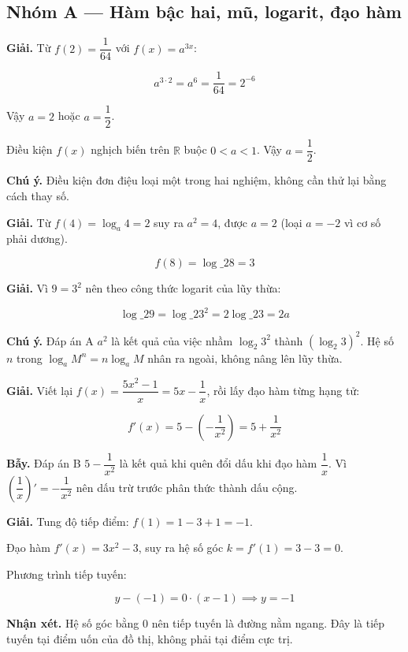 \documentclass[11pt, a4paper]{article}
\begin{document}

\subsection*{Nhóm A — Hàm bậc hai, mũ, logarit, đạo hàm}

\begin{dapan}[1 — Đáp án A]
\textbf{Giải.} Từ $f(2) = \dfrac{1}{64}$ với $f(x) = a^{3x}$:

$$a^{3 \cdot 2} = a^6 = \frac{1}{64} = 2^{-6}$$

Vậy $a = 2$ hoặc $a = \dfrac{1}{2}$.

Điều kiện $f(x)$ nghịch biến trên $\mathbb{R}$ buộc $0 < a < 1$. Vậy $a = \dfrac{1}{2}$.

\textbf{Chú ý.} Điều kiện đơn điệu loại một trong hai nghiệm, không cần thử lại bằng cách thay số.
\end{dapan}

\begin{dapan}[2 — Đáp án C]
\textbf{Giải.} Từ $f(4) = \log_a 4 = 2$ suy ra $a^2 = 4$, được $a = 2$ (loại $a = -2$ vì cơ số phải dương).

$$f(8) = \log\_2 8 = 3$$
\end{dapan}

\begin{dapan}[3 — Đáp án B]
\textbf{Giải.} Vì $9 = 3^2$ nên theo công thức logarit của lũy thừa:

$$\log\_2 9 = \log\_2 3^2 = 2\log\_2 3 = 2a$$

\textbf{Chú ý.} Đáp án A $a^2$ là kết quả của việc nhầm $\log_2 3^2$ thành $(\log_2 3)^2$. Hệ số $n$ trong $\log_a M^n = n\log_a M$ nhân ra ngoài, không nâng lên lũy thừa.
\end{dapan}

\begin{dapan}[4 — Đáp án D]
\textbf{Giải.} Viết lại $f(x) = \dfrac{5x^2 - 1}{x} = 5x - \dfrac{1}{x}$, rồi lấy đạo hàm từng hạng tử:

$$f'(x) = 5 - \left(-\frac{1}{x^2}\right) = 5 + \frac{1}{x^2}$$

\textbf{Bẫy.} Đáp án B $5 - \dfrac{1}{x^2}$ là kết quả khi quên đổi dấu khi đạo hàm $\dfrac{1}{x}$. Vì $\left(\dfrac{1}{x}\right)' = -\dfrac{1}{x^2}$ nên dấu trừ trước phân thức thành dấu cộng.
\end{dapan}

\begin{dapan}[5 — Đáp án A]
\textbf{Giải.} Tung độ tiếp điểm: $f(1) = 1 - 3 + 1 = -1$.

Đạo hàm $f'(x) = 3x^2 - 3$, suy ra hệ số góc $k = f'(1) = 3 - 3 = 0$.

Phương trình tiếp tuyến:

$$y - (-1) = 0 \cdot (x - 1) \implies y = -1$$

\textbf{Nhận xét.} Hệ số góc bằng $0$ nên tiếp tuyến là đường nằm ngang. Đây là tiếp tuyến tại điểm uốn của đồ thị, không phải tại điểm cực trị.
\end{dapan}
\end{document}
